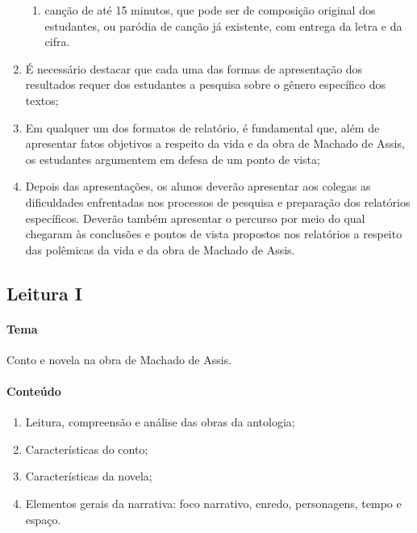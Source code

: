 \documentclass{extarticle}
\begin{document}
\begin{enumerate}
\begin{enumerate}
\item canção de até 15 minutos, que pode ser de composição original dos
estudantes, ou paródia de canção já existente, com entrega da letra e da
cifra.
\end{enumerate}

\item É necessário destacar que cada uma das formas de apresentação dos
resultados requer dos estudantes a pesquisa sobre o gênero específico
dos textos;

\item Em qualquer um dos formatos de relatório, é fundamental que, além de
apresentar fatos objetivos a respeito da vida e da obra de Machado de
Assis, os estudantes argumentem em defesa de um ponto de vista;

\item Depois das apresentações, os alunos deverão apresentar aos colegas as
dificuldades enfrentadas nos processos de pesquisa e preparação dos
relatórios específicos. Deverão também apresentar o percurso por meio do
qual chegaram às conclusões e pontos de vista propostos nos relatórios a
respeito das polêmicas da vida e da obra de Machado de Assis.
\end{enumerate}

\subsection{Leitura I}


\paragraph{Tema} Conto e novela na obra de Machado de Assis.

\paragraph{Conteúdo} 

\begin{enumerate}
\item Leitura, compreensão e análise das obras da antologia; 
\item Características do conto; 
\item Características da novela; 
\item Elementos gerais da narrativa: foco narrativo, enredo, personagens,
tempo e espaço.
\end{enumerate}
\end{document}
